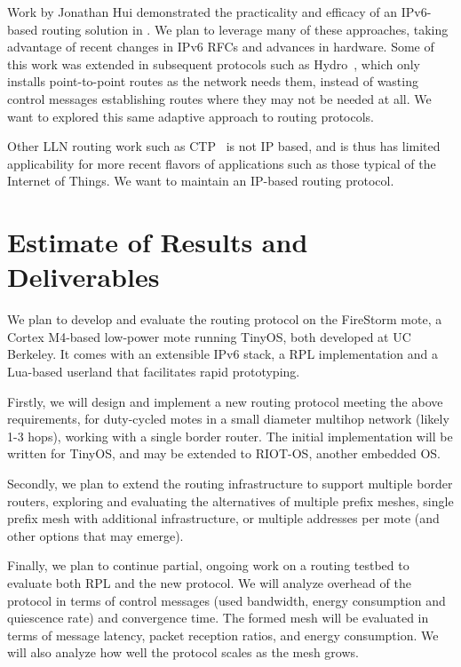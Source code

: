 \documentclass[10pt]{article}
\begin{document}
Work by Jonathan Hui demonstrated the practicality and efficacy of an
IPv6-based routing solution in \cite{hui2008ip, hui2008extended}. We plan to
leverage many of these approaches, taking advantage of recent changes in IPv6
RFCs and advances in hardware.  Some of this work was extended in subsequent
protocols such as Hydro~\cite{dawson2010hydro}, which only installs
point-to-point routes as the network needs them, instead of wasting control
messages establishing routes where they may not be needed at all. We want to
explored this same adaptive approach to routing protocols.

Other LLN routing work such as CTP~\cite{fonseca2006collection} is not IP
based, and is thus has limited applicability for more recent flavors of
applications such as those typical of the Internet of Things. We want to
maintain an IP-based routing protocol.


\section{Estimate of Results and Deliverables}

We plan to develop and evaluate the routing protocol on the FireStorm mote, a Cortex M4-based low-power mote running TinyOS, both developed at UC Berkeley. It comes with an extensible IPv6 stack, a RPL implementation and a Lua-based userland that facilitates rapid prototyping. 

Firstly, we will design and implement a new routing protocol meeting the above requirements, for duty-cycled motes in a small diameter multihop network (likely 1-3 hops), working with a single border router. The initial implementation will be written for TinyOS, and may be extended to RIOT-OS, another embedded OS.

Secondly, we plan to extend the routing infrastructure to support multiple border routers, exploring and evaluating the alternatives of multiple prefix meshes, single prefix mesh with additional infrastructure, or multiple addresses per mote (and other options that may emerge).

Finally, we plan to continue partial, ongoing work on a routing testbed to evaluate both RPL and the new protocol. We will analyze overhead of the protocol in terms of control messages (used bandwidth, energy consumption and quiescence rate) and convergence time. The formed mesh will be evaluated in terms of message latency, packet reception ratios, and energy consumption. We will also analyze how well the protocol scales as the mesh grows.


 
\end{document}
